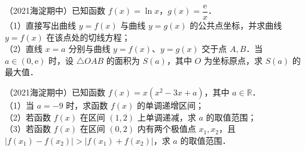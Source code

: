 \begin{example}
（2021海淀期中）已知函数 $f(x)=\ln x$，$g(x)=\dfrac{\mathrm{e}}{x}$．\\
（1）直接写出曲线 $y=f(x)$ 与曲线 $y=g(x)$ 的公共点坐标，并求曲线 $y=f(x)$ 在该点处的切线方程；\\
（2）直线 $x=a$ 分别与曲线 $y=f(x)$、$y=g(x)$ 交于点 $A,B$．当 $a\in(0,\mathrm{e})$ 时，设 $\triangle OAB$ 的面积为 $S(a)$，其中 $O$ 为坐标原点，求 $S(a)$ 的最大值．
\end{example}

\begin{example}
（2021海淀期中）已知函数 $f(x)=x(x^2-3x+a)$，其中 $a\in\mathbb{R}$．\\
（1）当 $a=-9$ 时，求函数 $f(x)$ 的单调递增区间；\\
（2）若函数 $f(x)$ 在区间 $(1,2)$ 上单调递减，求 $a$ 的取值范围；\\
（3）若函数 $f(x)$ 在区间 $(0,2)$ 内有两个极值点 $x_1,x_2$，且 $|f(x_1)-f(x_2)|>|f(x_1)+f(x_2)|$，求 $a$ 的取值范围．
\end{example}
